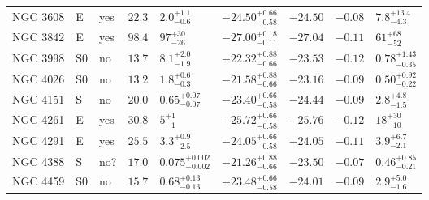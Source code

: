 \begin{table*}
\begin{center}
\begin{tabular}{lllllllll}
NGC 3608  &  E  &  yes   &  $22.3$  &  $2.0_{-0.6}^{+1.1}$   &  $-24.50_{-0.58}^{+0.66}$   &  $-24.50$   &  $-0.08$  &  $7.8_{-4.3}^{+13.4}$   \\ 
NGC 3842  &  E  &  yes   &  $98.4$  &  $97_{-26}^{+30}$   &  $-27.00_{-0.11}^{+0.18}$   &  $-27.04$   &  $-0.11$  &  $61_{-52}^{+68}$   \\ 
NGC 3998  &  S0  &  no   &  $13.7$  &  $8.1_{-1.9}^{+2.0}$   &  $-22.32_{-0.66}^{+0.88}$   &  $-23.53$   &  $-0.12$  &  $0.78_{-0.35}^{+1.43}$   \\ 
NGC 4026  &  S0  &  no   &  $13.2$  &  $1.8_{-0.3}^{+0.6}$   &  $-21.58_{-0.66}^{+0.88}$   &  $-23.16$   &  $-0.09$  &  $0.50_{-0.22}^{+0.92}$   \\ 
NGC 4151  &  S  &  no   &  $20.0$  &  $0.65_{-0.07}^{+0.07}$   &  $-23.40_{-0.58}^{+0.66}$   &  $-24.44$   &  $-0.09$  &  $2.8_{-1.5}^{+4.8}$   \\ 
NGC 4261  &  E  &  yes   &  $30.8$  &  $5_{-1}^{+1}$   &  $-25.72_{-0.58}^{+0.66}$   &  $-25.76$   &  $-0.12$  &  $18_{-10}^{+30}$   \\ 
NGC 4291  &  E  &  yes   &  $25.5$  &  $3.3_{-2.5}^{+0.9}$   &  $-24.05_{-0.58}^{+0.66}$   &  $-24.05$   &  $-0.11$  &  $3.9_{-2.1}^{+6.7}$   \\ 
NGC 4388  &  S  &  no?  &  $17.0$  &  $0.075_{-0.002}^{+0.002}$   &  $-21.26_{-0.66}^{+0.88}$   &  $-23.50$   &  $-0.07$  &  $0.46_{-0.21}^{+0.85}$   \\ 
NGC 4459  &  S0  &  no   &  $15.7$  &  $0.68_{-0.13}^{+0.13}$   &  $-23.48_{-0.58}^{+0.66}$   &  $-24.01$   &  $-0.09$  &  $2.9_{-1.6}^{+5.0}$   \\ 
\hline         
\end{tabular}   
\label{tab:sample} 
\end{center}    
\end{table*}    

